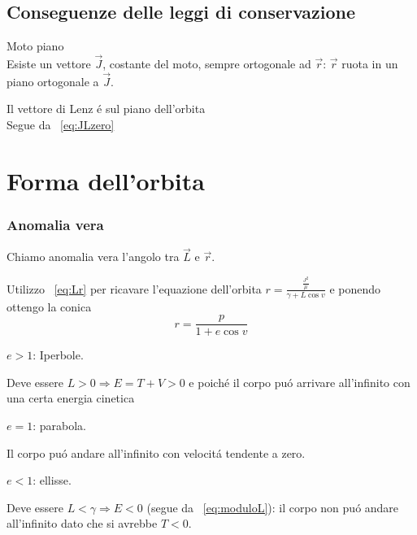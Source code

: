 \documentclass[oneside,12pt,fleqn]{memoir}
\begin{document}
\subsection{Conseguenze delle leggi di conservazione}

\begin{enumerate*}
\item Moto piano\\
Esiste un vettore $\vec{J}$, costante del moto, sempre ortogonale ad $\vec{r}$: $\vec{r}$ ruota in un piano ortogonale a $\vec{J}$.
\item Il vettore di Lenz \'e sul piano dell'orbita\\
Segue da ~\ref{eq:JLzero}
\end{enumerate*}


\section{Forma dell'orbita}


\subsubsection{Anomalia vera}

Chiamo anomalia vera l'angolo tra $\vec{L}$ e $\vec{r}$.

Utilizzo ~\ref{eq:Lr} per ricavare l'equazione dell'orbita $r=\frac{\frac{J^2}{\mu}}{\gamma+L\cos{v}}$ e ponendo  ottengo la conica
\begin{equation*}\label{eq:orbitaconica}
r=\frac{p}{1+e\cos{v}}
\end{equation*}

\begin{itemize*}
\item $e>1$: Iperbole.

Deve essere $L>0\Rightarrow E=T+V>0$ e poich\'e  il corpo pu\'o arrivare all'infinito con una certa energia cinetica

\item $e=1$: parabola.

Il corpo pu\'o andare all'infinito con velocit\'a tendente a zero.

\item $e<1$: ellisse.

Deve essere $L<\gamma\Rightarrow E<0$ (segue da ~\ref{eq:moduloL}): il corpo non pu\'o andare all'infinito dato che si avrebbe $T<0$.

\end{itemize*}
\end{document}
